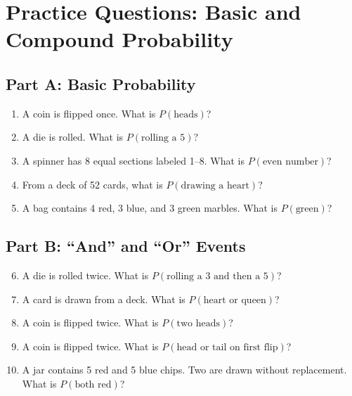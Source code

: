 \documentclass[14pt]{extarticle}
\begin{document}
\newpage


\section*{Practice Questions: Basic and Compound Probability}

\subsection*{Part A: Basic Probability}
\begin{enumerate}
  \item A coin is flipped once. What is \(P(\text{heads})\)?
  \item A die is rolled. What is \(P(\text{rolling a 5})\)?
  \item A spinner has 8 equal sections labeled 1–8. What is \(P(\text{even number})\)?
  \item From a deck of 52 cards, what is \(P(\text{drawing a heart})\)?
  \item A bag contains 4 red, 3 blue, and 3 green marbles. What is \(P(\text{green})\)?
\end{enumerate}

\subsection*{Part B: “And” and “Or” Events}
\begin{enumerate}
  \setcounter{enumi}{5}
  \item A die is rolled twice. What is \(P(\text{rolling a 3 and then a 5})\)?
  \item A card is drawn from a deck. What is \(P(\text{heart or queen})\)?
  \item A coin is flipped twice. What is \(P(\text{two heads})\)?
  \item A coin is flipped twice. What is \(P(\text{head or tail on first flip})\)?
  \item A jar contains 5 red and 5 blue chips. Two are drawn without replacement. What is \(P(\text{both red})\)?
\end{enumerate}
\end{document}
